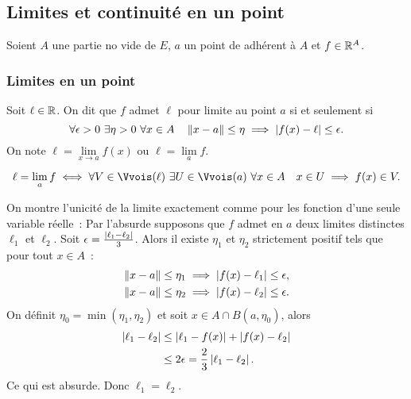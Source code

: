 \subsection{Limites et continuité en un point}

Soient $A$ une partie no vide de $E$, $a$ un point de adhérent à $A$ et $f \in \mathbb{R}^A$.

\subsubsection{Limites en un point}

\begin{defdef}
  Soit $\ell \in \mathbb{R}$. On dit que $f$ admet $\ell$ pour limite au point $a$ si et seulement si
  \begin{equation}
    \forall \epsilon>0 \ \exists \eta>0 \ \forall x \in A \quad \norme{x-a} \leq \eta \implies \abs{f(x)-\ell} \leq \epsilon.
  \end{equation}
  On note $\ell = \lim\limits_{x \to a} f(x)$ ou $\ell=\lim\limits_{a}f$.
\end{defdef}
\begin{defdef}
  \begin{equation}
    \ell=\lim\limits_{a}f \iff \forall V \in \Vvois(\ell) \ \exists U \in \Vvois(a) \ \forall x \in A \quad x \in U \implies f(x) \in V.
  \end{equation}
\end{defdef}

On montre l'unicité de la limite exactement comme pour les fonction d'une seule variable réelle~: Par l'absurde supposons que $f$ admet en $a$ deux limites distinctes $\ell_1$ et $\ell_2$. Soit $\epsilon = \frac{\left\lvert\ell_1 - \ell_2\right\rvert}{3}$. Alors il existe $\eta_1$ et $\eta_2$ strictement positif tels que pour tout $x \in A$~:
\begin{align}
  \left\lVert x-a\right\rVert \leq \eta_1 &\implies \left\lvert f(x)-\ell_1\right\rvert\leq \epsilon, \\
  \left\lVert x-a\right\rVert \leq \eta_2 &\implies \left\lvert f(x)-\ell_2\right\rvert\leq \epsilon.
\end{align}
On définit $\eta_0=\min(\eta_1, \eta_2)$ et soit $x \in A \cap B(a,\eta_0)$, alors
\begin{align}
  \left\lvert\ell_1-\ell_2\right\rvert &\leq \left\lvert\ell_1-f(x)\right\rvert + \left\lvert f(x)-\ell_2\right\rvert \\
  &\leq 2\epsilon = \frac{2}{3}\left\lvert\ell_1-\ell_2\right\rvert.
\end{align}
Ce qui est absurde. Donc $\ell_1=\ell_2$.

